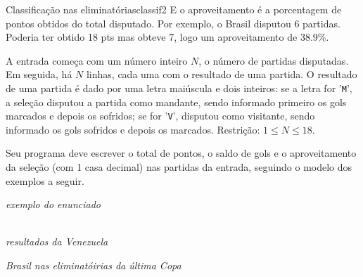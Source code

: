 \documentclass[12pt,a4paper,oneside]{article}
\begin{document}
\begin{problem}{Classificação nas eliminatórias}{classif}{2}
E o aproveitamento é a porcentagem de pontos obtidos do total disputado. Por exemplo, o Brasil disputou 6 partidas. Poderia ter obtido 18 pts mas obteve 7, logo um aproveitamento de 38.9\%.


%

\InputFile

A entrada começa com um número inteiro $N$, o número de partidas disputadas. Em seguida, há $N$ linhas, cada uma com o resultado de uma partida. O resultado de uma partida é dado por uma letra maiúscula e dois inteiros: se a letra for '\texttt{M}', a seleção disputou a partida como mandante, sendo informado primeiro os gols marcados e depois os sofridos; se for '\texttt{V}', disputou como visitante, sendo informado os gols sofridos e depois os marcados. Restrição: $1 \leq N \leq 18$.


\OutputFile

Seu programa deve escrever o total de pontos, o saldo de gols e o aproveitamento da seleção (com 1 casa decimal) nas partidas da entrada, seguindo o modelo dos exemplos a seguir.


\Example

\begin{example}
%
\end{example}
\textit{\small exemplo do enunciado
}

\begin{example}
%
\end{example}\\
\textit{\small resultados da Venezuela
}\\

\begin{example}
%
\end{example}
\textit{\small Brasil nas eliminatóirias da última Copa
}



\end{problem}
\end{document}
